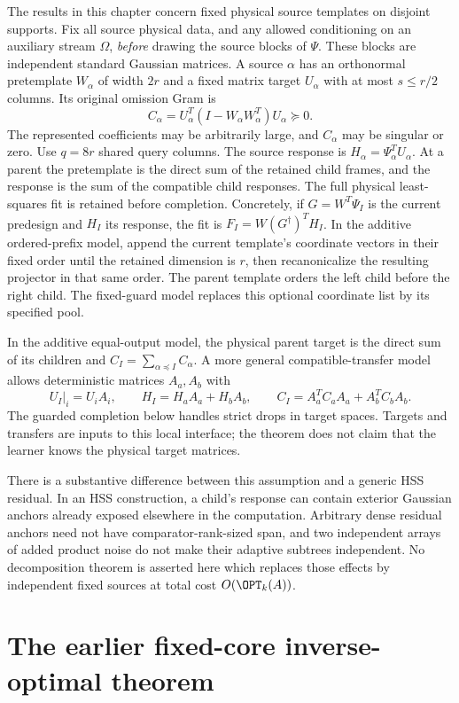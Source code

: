 \documentclass[11pt,oneside,openany,a4paper]{book}
\numberwithin{equation}{chapter}
\theoremstyle{definition}
\theoremstyle{remark}
\begin{document}
The results in this chapter concern fixed physical source templates on
disjoint supports.  Fix all source physical data, and any allowed
conditioning on an auxiliary stream $\Omega$, \emph{before} drawing the
source blocks of $\Psi$.  These blocks are independent standard
Gaussian matrices.  A source $\alpha$ has an orthonormal pretemplate
$W_\alpha$ of width $2r$ and a fixed matrix target $U_\alpha$ with at
most $s\leq r/2$ columns.  Its original omission Gram is
\[
 C_\alpha=U_\alpha^T(I-W_\alpha W_\alpha^T)U_\alpha\succeq0.
\]
The represented coefficients may be arbitrarily large, and
$C_\alpha$ may be singular or zero.  Use $q=8r$ shared query columns.
The source response is $H_\alpha=\Psi_\alpha^TU_\alpha$.
At a parent the pretemplate is the direct sum of the retained child
frames, and the response is the sum of the compatible child responses.
The full physical least-squares fit is retained before completion.
Concretely, if $G=W^T\Psi_I$ is the current predesign and $H_I$ its
response, the fit is $F_I=W(G^\dagger)^TH_I$.  In the additive
ordered-prefix model, append the current template's coordinate vectors
in their fixed order until the retained dimension is $r$, then
recanonicalize the resulting projector in that same order.  The parent
template orders the left child before the right child.  The fixed-guard
model replaces this optional coordinate list by its specified pool.

In the additive equal-output model, the physical parent target is the
direct sum of its children and
$C_I=\sum_{\alpha\preceq I}C_\alpha$.  A more general compatible-transfer
model allows deterministic matrices $A_a,A_b$ with
\[
 U_I|_i=U_iA_i,\qquad H_I=H_aA_a+H_bA_b,
 \qquad C_I=A_a^TC_aA_a+A_b^TC_bA_b.
\]
The guarded completion below handles strict drops in target spaces.
Targets and transfers are inputs to this local interface; the theorem
does not claim that the learner knows the physical target matrices.

There is a substantive difference between this assumption and a generic
HSS residual.  In an HSS construction, a child's response can contain
exterior Gaussian anchors already exposed elsewhere in the computation.
Arbitrary dense residual anchors need not have comparator-rank-sized
span, and two independent arrays of added product noise do not make
their adaptive subtrees independent.  No decomposition theorem is
asserted here which replaces those effects by independent fixed sources
at total cost $O(\OPT_k(A))$.

\section{The earlier fixed-core inverse-optimal theorem}
\end{document}

